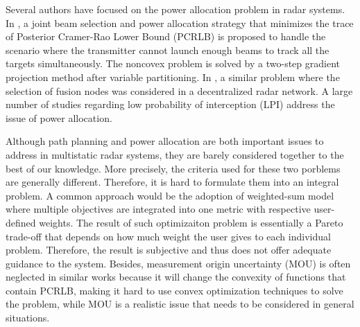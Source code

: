 \documentclass[12pt,journal,draftclsnofoot,onecolumn]{IEEEtran}
\begin{document}
Several authors have focused on the power allocation problem in radar systems\cite{alirezaei2014optimum,lu2018adaptive}. In \cite{yan2016joint}, a joint beam selection and power allocation strategy that minimizes the trace of Posterior Cramer-Rao Lower Bound (PCRLB) is proposed to handle the scenario where the transmitter cannot launch enough beams to track all the targets simultaneously. The noncovex problem is solved by a two-step gradient projection method after variable partitioning. %
In \cite{xie2017joint}, a similar problem where the selection of fusion nodes was considered in a decentralized radar network. A large number of studies regarding low probability of interception (LPI) address the issue of power allocation\cite{she2016novel}\cite{godrich2011power}.




Although path planning and power allocation are both important issues to address in multistatic radar systems, they are barely considered together %
to the best of our knowledge. More precisely, the criteria used for these two porblems are generally different. Therefore, it is hard to formulate them into an integral problem. A common approach would be the adoption of weighted-sum model where multiple objectives are integrated into one metric with respective user-defined weights. The result of such optimizaiton problem is essentially a Pareto trade-off that depends on how much weight the user gives to each individual problem. Therefore, the result is subjective and thus does not offer adequate guidance to the system. Besides, measurement origin uncertainty (MOU) is often neglected in similar works because it will change the convexity of functions that contain PCRLB, making it hard to use convex optimization techniques to solve the problem, while MOU is a realistic issue that needs to be considered in general situations.
\end{document}
